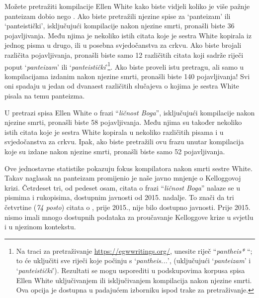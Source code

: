 Možete pretražiti kompilacije Ellen White kako biste vidjeli koliko je više pažnje panteizam dobio nego . Ako biste pretražili njezine spise za ‘panteizam’ ili ‘panteistički’, isključujući kompilacije nakon njezine smrti, pronašli biste 36 pojavljivanja. Među njima je nekoliko istih citata koje je sestra White kopirala iz jednog pisma u drugo, ili u posebna svjedočanstva za crkvu. Ako biste brojali različita pojavljivanja, pronašli biste samo 12 različitih citata koji sadrže riječi poput ‘\textit{panteizam}’ ili ‘\textit{panteistički}’\footnote{Na traci za pretraživanje \href{https://egwwritings.org/}{https://egwwritings.org/}, unesite riječ “\textit{pantheis*} “; to će uključiti sve riječi koje počinju s ‘\textit{pantheis...}’, (uključujući ‘\textit{panteizam}’ i ‘\textit{panteistički}’). Rezultati se mogu usporediti u podskupovima korpusa spisa Ellen White uključivanjem ili isključivanjem kompilacija nakon njezine smrti. Ova opcija je dostupna u padajućem izborniku ispod trake za pretraživanje.}. Ako biste proveli istu pretragu, ali samo u kompilacijama izdanim nakon njezine smrti, pronašli biste 140 pojavljivanja! Svi oni spadaju u jedan od dvanaest različitih slučajeva o kojima je sestra White pisala na temu panteizma.

U pretrazi spisa Ellen White o frazi “\textit{ličnost Boga}”, isključujući kompilacije nakon njezine smrti, pronašli biste 58 pojavljivanja. Među njima su također nekoliko istih citata koje je sestra White kopirala u nekoliko različitih pisama i u svjedočanstva za crkvu. Ipak, ako biste pretražili ovu frazu unutar kompilacija koje su izdane nakon njezine smrti, pronašli biste samo 52 pojavljivanja.

Ove jednostavne statistike pokazuju fokus kompilatora nakon smrti sestre White. Takav naglasak na panteizam promijenio je naše javno mnjenje o Kelloggovoj krizi. Četrdeset tri, od pedeset osam, citata o frazi “\textit{ličnost Boga}” nalaze se u pismima i rukopisima, dostupnim javnosti od 2015. nadalje. To znači da tri četvrtine (\textit{74 posto}) citata o , prije 2015., nije bilo dostupno javnosti. Prije 2015. nismo imali mnogo dostupnih podataka za proučavanje Kelloggove krize u svjetlu  i u njezinom kontekstu.

